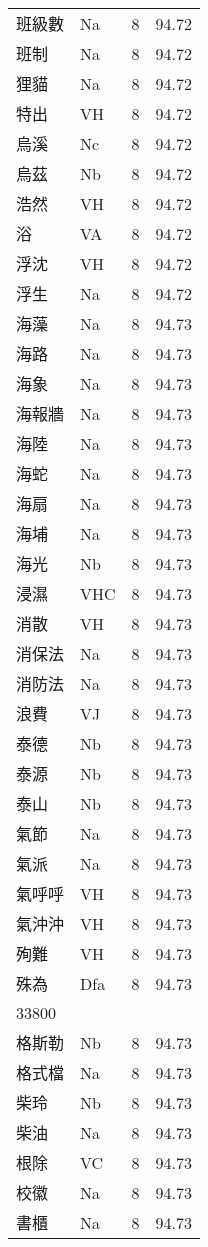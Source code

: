 \documentclass[twocolumn]{book}
\begin{document}
\begin{supertabular}{llrr}
班級數 & Na & 8 &  94.72\\
班制 & Na & 8 &  94.72\\
狸貓 & Na & 8 &  94.72\\
特出 & VH & 8 &  94.72\\
烏溪 & Nc & 8 &  94.72\\
烏茲 & Nb & 8 &  94.72\\
浩然 & VH & 8 &  94.72\\
浴 & VA & 8 &  94.72\\
浮沈 & VH & 8 &  94.72\\
浮生 & Na & 8 &  94.72\\
海藻 & Na & 8 &  94.73\\
海路 & Na & 8 &  94.73\\
海象 & Na & 8 &  94.73\\
海報牆 & Na & 8 &  94.73\\
海陸 & Na & 8 &  94.73\\
海蛇 & Na & 8 &  94.73\\
海扇 & Na & 8 &  94.73\\
海埔 & Na & 8 &  94.73\\
海光 & Nb & 8 &  94.73\\
浸濕 & VHC & 8 &  94.73\\
消散 & VH & 8 &  94.73\\
消保法 & Na & 8 &  94.73\\
消防法 & Na & 8 &  94.73\\
浪費 & VJ & 8 &  94.73\\
泰德 & Nb & 8 &  94.73\\
泰源 & Nb & 8 &  94.73\\
泰山 & Nb & 8 &  94.73\\
氣節 & Na & 8 &  94.73\\
氣派 & Na & 8 &  94.73\\
氣呼呼 & VH & 8 &  94.73\\
氣沖沖 & VH & 8 &  94.73\\
殉難 & VH & 8 &  94.73\\
殊為 & Dfa & 8 &  94.73\\
33800\\
格斯勒 & Nb & 8 &  94.73\\
格式檔 & Na & 8 &  94.73\\
柴玲 & Nb & 8 &  94.73\\
柴油 & Na & 8 &  94.73\\
根除 & VC & 8 &  94.73\\
校徽 & Na & 8 &  94.73\\
書櫃 & Na & 8 &  94.73\\

\end{supertabular}
\end{document}
